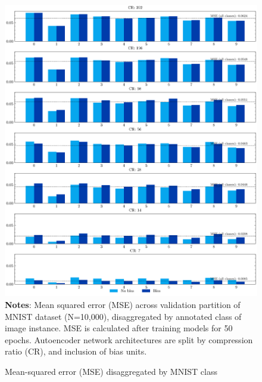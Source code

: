 \begin{figure}
    \caption{Mean-squared error (MSE) disaggregated by MNIST class}
	\label{fig:decoded-instances}
	\includegraphics[width=1.0\textwidth]{graphics/mse_by_class.pdf}
    \textbf{Notes}: Mean squared error (MSE) across validation partition of MNIST dataset (N=10,000), disaggregated by annotated class of image instance. MSE is calculated after training models for 50 epochs. Autoencoder network architectures are split by compression ratio (CR), and inclusion of bias units.
\end{figure}


